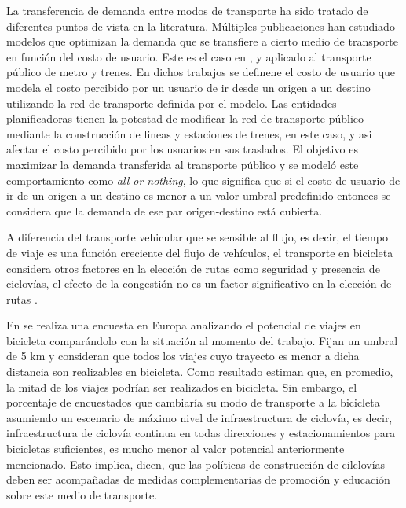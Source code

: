 \documentclass{article}
\begin{document}

  La transferencia de demanda entre modos de transporte ha sido tratado de diferentes puntos de vista en la literatura. Múltiples publicaciones han estudiado modelos que optimizan la demanda que se transfiere a cierto medio de transporte en función del costo de usuario. Este es el caso en \cite{garcia2005}, \cite{laporte2007} y \cite{marin2007} aplicado al transporte público de metro y trenes. En dichos trabajos se definene el costo de usuario que modela el costo percibido por un usuario de ir desde un origen a un destino utilizando la red de transporte definida por el modelo. Las entidades planificadoras tienen la potestad de modificar la red de transporte público mediante la construcción de lineas y estaciones de trenes, en este caso, y asi afectar el costo percibido por los usuarios en sus traslados. El objetivo es maximizar la demanda transferida al transporte público y se modeló este comportamiento como {\it all-or-nothing}, lo que significa que si el costo de usuario de ir de un origen a un destino es menor a un valor umbral predefinido entonces se considera que la demanda de ese par origen-destino está cubierta.


  A diferencia del transporte vehicular que se sensible al flujo, es decir, el tiempo de viaje es una función creciente del flujo de vehículos, el transporte en bicicleta considera otros factores en la elección de rutas como seguridad y presencia de ciclovías, el efecto de la congestión no es un factor significativo en la elección de rutas \cite{broach2012}.

  En \cite{shwe2014} se realiza una encuesta en Europa analizando el potencial de viajes en bicicleta comparándolo con la situación al momento del trabajo. Fijan un umbral de 5 km y consideran que todos los viajes cuyo trayecto es menor a dicha distancia son realizables en bicicleta. Como resultado estiman que, en promedio, la mitad de los viajes podrían ser realizados en bicicleta. Sin embargo, el porcentaje de encuestados que cambiaría su modo de transporte a la bicicleta asumiendo un escenario de máximo nivel de infraestructura de ciclovía, es decir, infraestructura de ciclovía continua en todas direcciones y estacionamientos para bicicletas suficientes, es mucho menor al valor potencial anteriormente mencionado. Esto implica, dicen, que las políticas de construcción de cilclovías deben ser acompañadas de medidas complementarias de promoción y educación sobre este medio de transporte.
\end{document}
